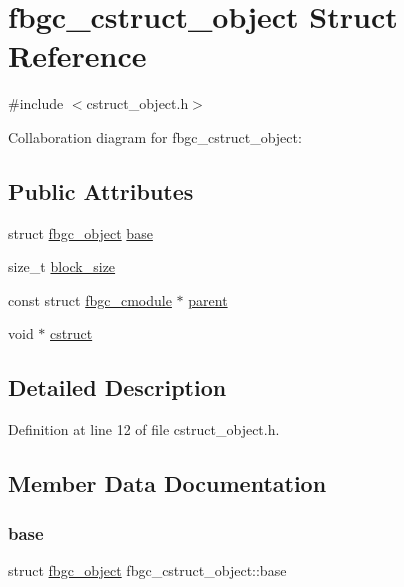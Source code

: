 \hypertarget{structfbgc__cstruct__object}{}\section{fbgc\+\_\+cstruct\+\_\+object Struct Reference}
\label{structfbgc__cstruct__object}


{\ttfamily \#include $<$cstruct\+\_\+object.\+h$>$}



Collaboration diagram for fbgc\+\_\+cstruct\+\_\+object\+:
\subsection*{Public Attributes}
\begin{DoxyCompactItemize}
\item 
struct \hyperlink{structfbgc__object}{fbgc\+\_\+object} \hyperlink{structfbgc__cstruct__object_adab81d777a6b3fb10c6359121a054fe9}{base}
\item 
size\+\_\+t \hyperlink{structfbgc__cstruct__object_a6246dee94eecb694e50cbb196f234523}{block\+\_\+size}
\item 
const struct \hyperlink{structfbgc__cmodule}{fbgc\+\_\+cmodule} $\ast$ \hyperlink{structfbgc__cstruct__object_a2b5d0862bce151a1e64f5efd63a6c789}{parent}
\item 
void $\ast$ \hyperlink{structfbgc__cstruct__object_a04ff6121d5b752d186800c1631771588}{cstruct}
\end{DoxyCompactItemize}


\subsection{Detailed Description}


Definition at line 12 of file cstruct\+\_\+object.\+h.



\subsection{Member Data Documentation}
\mbox{\label{structfbgc__cstruct__object_adab81d777a6b3fb10c6359121a054fe9}} 
\subsubsection{\texorpdfstring{base}{base}}
{\footnotesize\ttfamily struct \hyperlink{structfbgc__object}{fbgc\+\_\+object} fbgc\+\_\+cstruct\+\_\+object\+::base}



